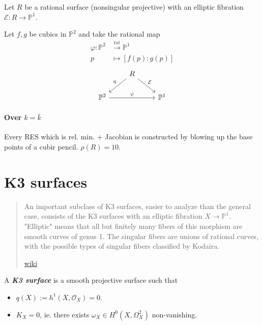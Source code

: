 \begin{defn}
	Let $R$ be a rational surface (nonsingular projective) with an elliptic fibration $\mathcal{E}:R\to \mathbb{P}^1$.
\end{defn}

\begin{example}
	Let $f,g$ be cubics in  $\mathbb{P}^2$ and take the rational map
	\begin{align*}
		\varphi: \mathbb{P}^2 &\overset{\operatorname{rat}}{\longrightarrow} \mathbb{P}^1 \\
		p &\longmapsto [f(p):g(p)]
	\end{align*}
	\[\begin{tikzcd}
	&R\arrow[dl,"\eta",swap]\arrow[dr,"\mathcal{E}"]\\
	\mathbb{P}^2\arrow[rr,"\varphi"]&&\mathbb{P}^1
	\end{tikzcd}\]
\end{example}

\paragraph{Over $k=\bar{k}$} Every RES which is rel. min. + Jacobian is constructed by blowing up the base points of a cubir pencil. $\rho(R)=10$.

\section{K3 surfaces}

\begin{quotation}
	An important subclass of K3 surfaces, easier to analyze than the general case, consists of the K3 surfaces with an elliptic fibration $X\to \mathbb{P}^1$. "Elliptic" means that all but finitely many fibers of this morphism are smooth curves of genus 1. The singular fibers are unions of rational curves, with the possible types of singular fibers classified by Kodaira.
	
	\hfill \href{https://en.wikipedia.org/wiki/K3_surface#Elliptic_K3_surfaces}{wiki}
\end{quotation}


\begin{defn}
	A \textit{\textbf{K3 surface}} is a smooth projective surface such that
	\begin{itemize}
	\item $q(X):=h^1(X,\mathcal{O}_X)=0$.

	\item $K_X=0$, ie. there exists  $\omega_X\in H^{0}(X,\Omega^2_X)$ non-vanishing.
	\end{itemize}
\end{defn}

